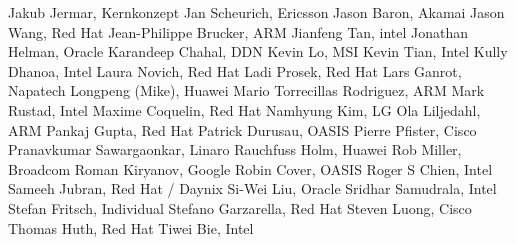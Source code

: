 Jakub Jermar,	Kernkonzept	\newline
Jan Scheurich,	Ericsson	\newline
Jason Baron,	Akamai	\newline
Jason Wang, Red Hat \newline
Jean-Philippe Brucker,	ARM	\newline
Jianfeng Tan,	intel	\newline
Jonathan Helman,	Oracle	\newline
Karandeep Chahal,	DDN	\newline
Kevin Lo,	MSI	\newline
Kevin Tian,	Intel	\newline
Kully Dhanoa,	Intel	\newline
Laura Novich, Red Hat	\newline
Ladi Prosek,	Red Hat	\newline
Lars Ganrot,	Napatech	\newline
Longpeng (Mike),	Huawei	\newline
Mario Torrecillas Rodriguez,	ARM	\newline
Mark Rustad,	Intel	\newline
Maxime Coquelin,	Red Hat	\newline
Namhyung Kim,	LG	\newline
Ola Liljedahl,	ARM	\newline
Pankaj Gupta,	Red Hat	\newline
Patrick Durusau,	OASIS	\newline
Pierre Pfister,	Cisco	\newline
Pranavkumar Sawargaonkar,	Linaro	\newline
Rauchfuss Holm,	Huawei	\newline
Rob Miller,	Broadcom	\newline
Roman Kiryanov,	Google	\newline
Robin Cover,	OASIS	\newline
Roger S Chien,	Intel	\newline
Sameeh Jubran,	Red Hat / Daynix	\newline
Si-Wei Liu,	Oracle	\newline
Sridhar Samudrala,	Intel	\newline
Stefan Fritsch,	Individual \newline
Stefano Garzarella,	Red Hat	\newline
Steven Luong,	Cisco	\newline
Thomas Huth,	Red Hat	\newline
Tiwei Bie,	Intel	\newline
